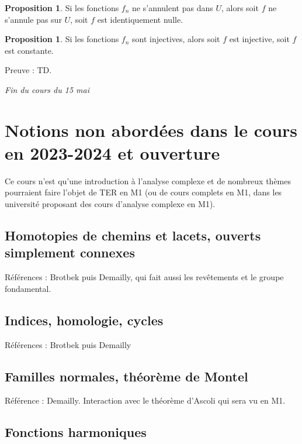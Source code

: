 \documentclass[11pt,a4paper]{book}
\theoremstyle{definition}
\newtheorem{proposition}[theoreme]{Proposition}
\theoremstyle{plain}
\begin{document}
\begin{proposition}
Si les fonctions $f_n$ ne s'annulent pas dans $U$, alors soit $f$ ne s'annule pas sur $U$, soit $f$ est identiquement nulle.
\end{proposition}

\begin{proposition}
Si les fonctions $f_n$ sont injectives, alors soit $f$ est injective, soit $f$ est constante.
\end{proposition}

Preuve : TD.


\begin{center}
\hrulefill \emph{Fin du cours du 15 mai} \hrulefill
\end{center}





\section{Notions non abordées dans le cours en 2023-2024 et ouverture}

Ce cours n'est qu'une introduction à l'analyse complexe et de nombreux thèmes pourraient faire l'objet de TER en M1 (ou de cours complets en M1, dans les université proposant des cours d'analyse complexe en M1). 

\subsection{Homotopies de chemins et lacets, ouverts simplement connexes}

Références : Brotbek puis Demailly, qui fait aussi les revêtements et le groupe fondamental.

\subsection{Indices, homologie, cycles}

Références : Brotbek puis Demailly

\subsection{Familles normales, théorème de Montel}

Référence : Demailly. Interaction avec le théorème d'Ascoli qui sera vu en M1.

\subsection{Fonctions harmoniques}
\end{document}
